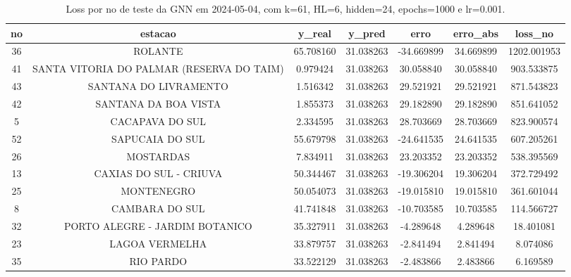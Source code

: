 \begin{table}[h]
\centering
\caption{Loss por no de teste da GNN em 2024-05-04, com k=61, HL=6, hidden=24, epochs=1000 e lr=0.001.}
\label{tab:gnn_loss_k61_hl6_h24_e1000_d20240504}
\begin{tabular}{ccccccc}
\toprule
no & estacao & y\_real & y\_pred & erro & erro\_abs & loss\_no \\
\midrule
36 & ROLANTE & 65.708160 & 31.038263 & -34.669899 & 34.669899 & 1202.001953 \\
41 & SANTA VITORIA DO PALMAR (RESERVA DO TAIM) & 0.979424 & 31.038263 & 30.058840 & 30.058840 & 903.533875 \\
43 & SANTANA DO LIVRAMENTO & 1.516342 & 31.038263 & 29.521921 & 29.521921 & 871.543823 \\
42 & SANTANA DA BOA VISTA & 1.855373 & 31.038263 & 29.182890 & 29.182890 & 851.641052 \\
5 & CACAPAVA DO SUL & 2.334595 & 31.038263 & 28.703669 & 28.703669 & 823.900574 \\
52 & SAPUCAIA DO SUL & 55.679798 & 31.038263 & -24.641535 & 24.641535 & 607.205261 \\
26 & MOSTARDAS & 7.834911 & 31.038263 & 23.203352 & 23.203352 & 538.395569 \\
13 & CAXIAS DO SUL - CRIUVA & 50.344467 & 31.038263 & -19.306204 & 19.306204 & 372.729492 \\
25 & MONTENEGRO & 50.054073 & 31.038263 & -19.015810 & 19.015810 & 361.601044 \\
8 & CAMBARA DO SUL & 41.741848 & 31.038263 & -10.703585 & 10.703585 & 114.566727 \\
32 & PORTO ALEGRE - JARDIM BOTANICO & 35.327911 & 31.038263 & -4.289648 & 4.289648 & 18.401081 \\
23 & LAGOA VERMELHA & 33.879757 & 31.038263 & -2.841494 & 2.841494 & 8.074086 \\
35 & RIO PARDO & 33.522129 & 31.038263 & -2.483866 & 2.483866 & 6.169589 \\
\bottomrule
\end{tabular}
\end{table}
